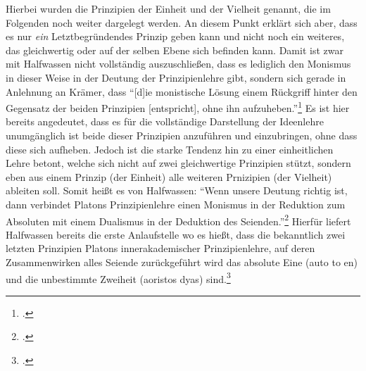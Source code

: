 Hierbei wurden die Prinzipien der Einheit und der Vielheit genannt, die im Folgenden noch weiter dargelegt werden. An diesem Punkt erklärt sich aber, dass es nur \emph{ein} Letztbegründendes Prinzip geben kann und nicht noch ein weiteres, das gleichwertig oder auf der selben Ebene sich befinden kann.
Damit ist zwar mit Halfwassen nicht vollständig auszuschließen, dass es lediglich den Monismus in dieser Weise in der Deutung der Prinzipienlehre gibt, sondern sich gerade in Anlehnung an Krämer, dass \enquote{[d]ie monistische Lösung einem Rückgriff hinter den Gegensatz der beiden Prinzipien [entspricht], ohne ihn aufzuheben.}\footcite[vgl.][S. 333]{Krämer1964Geistmetaphysik} 
Es ist hier bereits angedeutet, dass es für die vollständige Darstellung der Ideenlehre unumgänglich ist beide dieser Prinzipien anzuführen und einzubringen, ohne dass diese sich aufheben. Jedoch ist die starke Tendenz hin zu einer einheitlichen Lehre betont, welche sich nicht auf zwei gleichwertige Prinzipien stützt, sondern eben aus einem Prinzip (der Einheit) alle weiteren Prnizipien (der Vielheit) ableiten soll. Somit heißt es von Halfwassen:
\enquote{Wenn unsere Deutung richtig ist, dann verbindet Platons Prinzipienlehre einen Monismus in der Reduktion zum Absoluten mit einem Dualismus in der Deduktion des Seienden.}\footcite[][S. 79]{HalfwassenMonismusDualismus} 
Hierfür liefert Halfwassen bereits die erste Anlaufstelle wo es hießt, dass die bekanntlich zwei letzten Prinzipien Platons innerakademischer Prinzipienlehre, auf deren Zusammenwirken alles Seiende zurückgeführt wird das absolute Eine (auto to en) und die unbestimmte Zweiheit (aoristos dyas) sind.\footcite[vgl.][S. 67]{HalfwassenMonismusDualismus}

